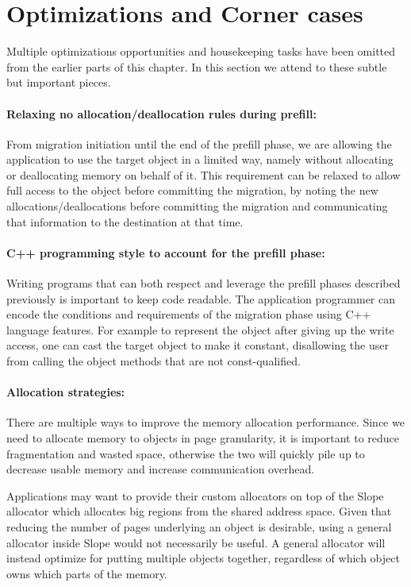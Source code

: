 \label{migration_protocol_end_label}

\section{Optimizations and Corner cases}
\label{sec:optim}
Multiple optimizations opportunities and housekeeping tasks have been omitted
from the earlier parts of this chapter. In this section we attend to these
subtle but important pieces.

\paragraph{Relaxing no allocation/deallocation rules during prefill:}
From migration initiation until the end of the prefill phase, we are allowing
the application to use the target object in a limited way, namely without
allocating or deallocating memory on behalf of it. This requirement can be
relaxed to allow full access to the object before committing the
migration, by noting the new allocations/deallocations before committing the
migration and communicating that information to the destination at that time.

\paragraph{C++ programming style to account for the prefill phase:}
\label{sec:conform}
Writing programs that can both respect and leverage the prefill phases
described previously is important to keep code readable. The application
programmer can encode the
conditions and requirements of the migration phase using C++ language features.
For example to represent the object after giving up the write access, one can
cast the target object to make it constant, disallowing the user from calling
the object methods that are not const-qualified.

\paragraph{Allocation strategies:} There are multiple ways to improve the memory
allocation performance. Since we need to allocate memory to objects in page
granularity, it is important to reduce fragmentation and wasted space,
otherwise the two will quickly pile up to decrease usable memory and increase
communication overhead.

Applications may want to provide their custom allocators on top of the Slope
allocator which allocates big regions from the shared address space. Given that
reducing the number of pages underlying an object is desirable, using a general
allocator inside Slope would not necessarily be useful. A general allocator
will instead optimize for putting multiple objects together, regardless of which
object owns which parts of the memory.

